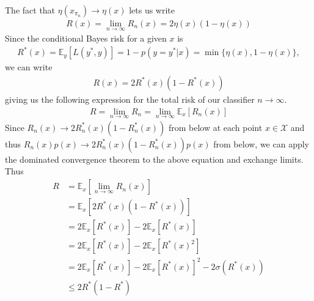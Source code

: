 \documentclass[11pt,letter]{article}
\begin{document}
\begin{enumerate}
    The fact that $\eta(x_{\pi_n}) \to \eta(x)$ lets us write
    \begin{align*}
        R(x) = \lim_{n \to \infty} R_n(x) = 2\eta(x)(1 - \eta(x))
    \end{align*}
    Since the conditional Bayes risk for a given $x$ is
    \begin{align*}
         R^*(x) = \mathbb E_y[L(y^*,y)] = 1 - p(y = y^* \vert x) =  \min\{\eta(x),1-\eta(x)\},
    \end{align*}
    we can write
    \begin{align*}
        R(x) = 2R^*(x)(1 - R^*(x))
    \end{align*}
    giving us the following expression for the total risk of our classifier $n \to \infty$.
    \begin{align*}
        R = \lim_{n \to \infty} R_n = \lim_{n \to \infty} \mathbb E_x [R_n(x)]
    \end{align*}
    Since $R_n(x) \to 2R_n^*(x)(1 - R_n^*(x))$ from below at each point $x \in \mathcal X$ and thus $R_n(x)p(x) \to 2R_n^*(x)(1 - R_n^*(x))p(x)$ from below, we can apply the dominated convergence theorem to the above equation and exchange limits. Thus
    \begin{align*}
        R & = \mathbb E_x[\lim_{n \to \infty} R_n(x)] \\
        & = \mathbb E_x[2R^*(x)(1 - R^*(x))] \\ 
        & = 2 \mathbb E_x[R^*(x)]  - 2 \mathbb E_x[R^*(x)] \\
        & = 2 \mathbb E_x[R^*(x)]  - 2 \mathbb E_x[R^*(x)^2] \\
        & = 2 \mathbb E_x[R^*(x)]  - 2 \mathbb E_x[R^*(x)]^2 - 2\sigma(R^*(x)) \\
        & \le 2R^*(1 - R^*)
    \end{align*}
\end{enumerate}
\end{document}
